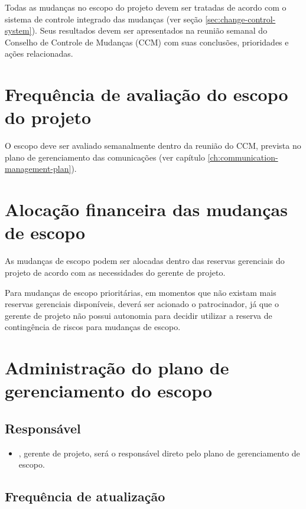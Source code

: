 Todas as mudanças no escopo do projeto devem ser tratadas de acordo com o sistema de controle integrado das mudanças (ver seção \ref{sec:change-control-system}). Seus resultados devem ser apresentados na reunião semanal do Conselho de Controle de Mudanças (CCM) com suas conclusões, prioridades e ações relacionadas.

\section{Frequência de avaliação do escopo do projeto}

O escopo deve ser avaliado semanalmente dentro da reunião do CCM, prevista no plano de gerenciamento das comunicações (ver capítulo \ref{ch:communication-management-plan}).

\section{Alocação financeira das mudanças de escopo}

As mudanças de escopo podem ser alocadas dentro das reservas gerenciais do projeto de acordo com as necessidades do gerente de projeto.

Para mudanças de escopo prioritárias, em momentos que não existam mais reservas gerenciais disponíveis, deverá ser acionado o patrocinador, já que o gerente de projeto não possui autonomia para decidir utilizar a reserva de contingência de riscos para mudanças de escopo.

\section{Administração do plano de gerenciamento do escopo}

\subsection{Responsável}

\begin{itemize}
	\item \projectManagerName{}, gerente de projeto, será o responsável direto pelo plano de gerenciamento de escopo.
\end{itemize}

\subsection{Frequência de atualização}

